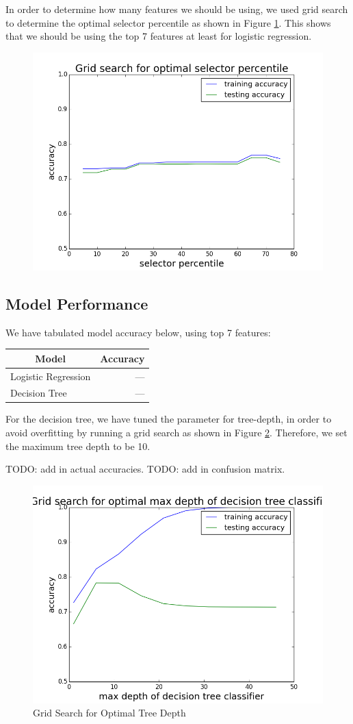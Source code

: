 \documentclass[12pt,twocolumn]{article}
\begin{document}
In order to determine how many features we should be using, we used grid search to determine the optimal selector percentile as shown in Figure \ref{fig:selectorpercentilegridsearch}. This shows that we should be using the top 7 features at least for logistic regression. 
\begin{figure}
\centering
\includegraphics[width=0.7\linewidth]{selector_percentile_grid_search}
\caption{}
\label{fig:selectorpercentilegridsearch}
\end{figure}

\subsection{Model Performance}
We have tabulated model accuracy below, using top 7 features: \\
\begin{tabular}{|l|r|}
\hline
\multicolumn{1}{|c|}{Model} & \multicolumn{1}{c|}{Accuracy} \\ \hline
Logistic Regression   & ---              \\ \hline
Decision Tree               & ---                  \\ \hline
\end{tabular}

For the decision tree, we have tuned the parameter for tree-depth, in order to avoid overfitting by running a grid search as shown in Figure \ref{fig:max_depth_grid}. Therefore, we set the maximum tree depth to be 10. 

TODO: add in actual accuracies. 
TODO: add in confusion matrix. 

\begin{figure}
\centering
\includegraphics[width=0.7\linewidth]{max_depth_grid}
\caption{ Grid Search for Optimal Tree Depth}
\label{fig:max_depth_grid}
\end{figure}
\end{document}
